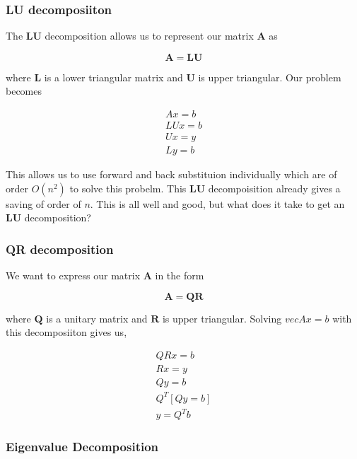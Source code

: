 \documentclass[12pt]{article}
\renewcommand{\vec}[1]{\mathbf{#1}}
\theoremstyle{definition}
\theoremstyle{remark}
\numberwithin{equation}{section}
\begin{document}
  \subsubsection{LU decomposiiton}%
  \label{ssub:lu_decomposiiton}
  
  The $\vec{LU}$ decomposition allows us to represent our matrix $\vec{A}$ as 

  \begin{equation}
    \vec{A} = \vec{LU}
  \end{equation}
  
  where $\vec{L}$ is a lower triangular matrix and $\vec{U}$ is upper triangular. Our problem becomes

  \begin{align}
    A x= b \\
    LUx = b \\
    Ux = y \\
    Ly = b 
  \end{align}
  
  This allows us to use forward and back substituion individually which are of order $O(n^2)$ to solve this probelm. This $\vec{LU}$ decompoisition already gives a saving of order of $n$. This is all well and good, but what does it take to get an $\vec{LU}$ decomposition?


  \subsubsection{QR decomposition}%
  \label{ssub:qr_decomposition}
  
  We want to express our matrix $\vec{A}$ in the form

  \begin{equation}
    \vec{A} = \vec{QR}
  \end{equation}
  
  where $\vec{Q}$ is a unitary matrix and $\vec{R}$ is upper triangular. Solving $vec{A}x=b$ with this decomposiiton gives us,
  
  \begin{align}
    QRx=b\\
    Rx = y\\
    Qy = b \\
    Q^T [Qy = b] \\
    y = Q^T b
  \end{align}

\subsubsection{Eigenvalue Decomposition}%
\label{ssub:eigenvalue_decomposition}
\end{document}
